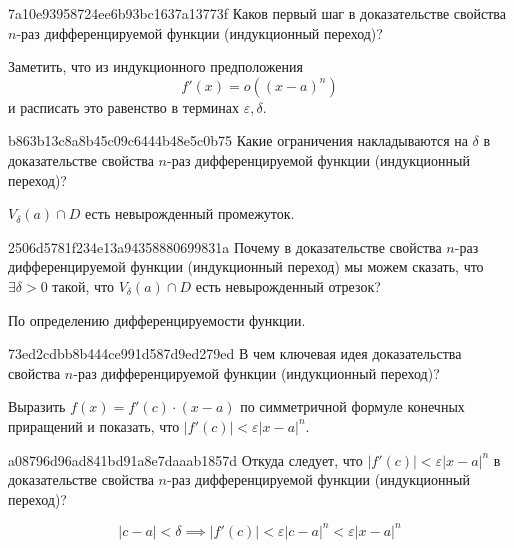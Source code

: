 \begin{note}{7a10e93958724ee6b93bc1637a13773f}
    Каков первый шаг в доказательстве свойства \( n \)-раз дифференцируемой функции (индукционный переход)?

    \begin{cloze}{1}
        Заметить, что из индукционного предположения
        \[
            f'(x) = o((x - a)^{n} )
        \]
        и расписать это равенство в терминах \( \varepsilon, \delta. \)
    \end{cloze}
\end{note}

\begin{note}{b863b13c8a8b45c09c6444b48e5c0b75}
    Какие ограничения накладываются на \( \delta \) в доказательстве свойства \( n \)-раз дифференцируемой функции (индукционный переход)?

    \begin{cloze}{1}
        \( V_{\delta} (a) \cap D \) есть невырожденный промежуток.
    \end{cloze}
\end{note}

\begin{note}{2506d5781f234e13a94358880699831a}
    Почему в доказательстве свойства \( n \)-раз дифференцируемой функции (индукционный переход) мы можем сказать, что
    \( \exists \delta > 0 \) такой,  что \( V_{\delta} (a) \cap D \) есть невырожденный отрезок?

    \begin{cloze}{1}
        По определению дифференцируемости функции.
    \end{cloze}
\end{note}

\begin{note}{73ed2cdbb8b444ce991d587d9ed279ed}
    В чем ключевая идея доказательства свойства \( n \)-раз дифференцируемой функции (индукционный переход)?

    \begin{cloze}{1}
        Выразить \( f(x) = f'(c) \cdot (x - a) \) по симметричной формуле конечных приращений и показать, что \( |f'(c)| < \varepsilon |x - a|^{n} \).
    \end{cloze}
\end{note}

\begin{note}{a08796d96ad841bd91a8e7daaab1857d}
    Откуда следует, что \( |f'(c)| < \varepsilon|x - a|^{n}  \) в доказательстве свойства \( n \)-раз дифференцируемой функции (индукционный переход)?

    \begin{cloze}{1}
        \[
            |c - a| < \delta \implies |f'(c)| < \varepsilon|c - a|^{n} < \varepsilon|x - a|^{n}
        \]
    \end{cloze}
\end{note}

